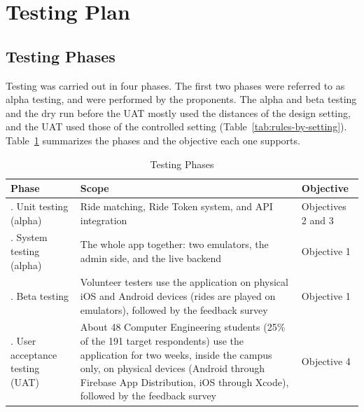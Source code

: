 \section{Testing Plan} 
\subsection{Testing Phases}
\label{sec:phases}
Testing was carried out in four phases. The first two phases were referred to as alpha testing, and were performed by the proponents. The alpha and beta testing and the dry run before the UAT mostly used the distances of the design setting, and the UAT used those of the controlled setting (Table~\ref{tab:rules-by-setting}). Table~\ref{tab:phases} summarizes the phases and the objective each one supports.

\begin{table}[htbp]
    \centering
    \caption{Testing Phases}
    \label{tab:phases}
    \small
    \renewcommand{\arraystretch}{1.2}
    \begin{tabular}{|>{\raggedright\arraybackslash}p{}|>{\raggedright\arraybackslash}p{}|>{\raggedright\arraybackslash}p{}|}
        \hline
        \textbf{Phase} & \textbf{Scope} & \textbf{Objective} \\
        \hline
        1. Unit testing (alpha) & Ride matching, Ride Token system, and API integration & Objectives 2 and 3 \\
        2. System testing (alpha) & The whole app together: two emulators, the admin side, and the live backend & Objective 1 \\
        3. Beta testing & Volunteer testers use the application on physical iOS and Android devices (rides are played on emulators), followed by the feedback survey & Objective 1 \\
        4. User acceptance testing (UAT) & About 48 Computer Engineering students (25\% of the 191 target respondents) use the application for two weeks, inside the campus only, on physical devices (Android through Firebase App Distribution, iOS through Xcode), followed by the feedback survey & Objective 4 \\
        \hline
    \end{tabular}
\end{table}

